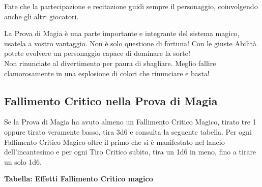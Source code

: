 \begin{multicols}{2}
\begin{narratore}
Fate che la partecipazione e recitazione guidi sempre il personaggio, coinvolgendo anche gli altri giocatori.
\end{narratore}

\medskip




\begin{giocatore}
La Prova di Magia è una parte importante e integrante del sistema magico, usatela a vostro vantaggio. Non è solo questione di fortuna! Con le giuste Abilità potete evolvere un personaggio capace di dominare la sorte!\\

Non rinunciate al divertimento per paura di sbagliare. Meglio fallire clamorosamente in una esplosione di colori che rinunciare e basta!
\end{giocatore}


\subsection{Fallimento Critico nella Prova di Magia}\label{magiefallimentocriticonellaprovadimagia}\hypertarget{magiefallimentocriticonellaprovadimagia}{}

Se la Prova di Magia ha avuto almeno un Fallimento Critico Magico, tirato tre 1 oppure tirato veramente basso, tira 3d6 e consulta la seguente tabella. Per ogni Fallimento Critico Magico oltre il primo che si è manifestato nel lancio dell'incantesimo e per ogni Tiro Critico subito, tira un 1d6 in meno, fino a tirare un solo 1d6.

\medskip

\textbf{Tabella: Effetti Fallimento Critico magico}

\medskip


\end{multicols}
